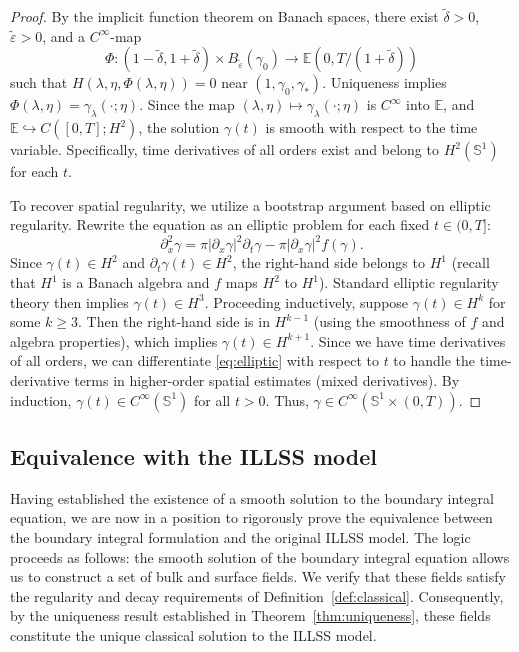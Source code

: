 \documentclass{article}
\theoremstyle{remark}
\theoremstyle{definition}
\numberwithin{equation}{section}
\begin{document}
\begin{proof}
    By the implicit function theorem on Banach spaces, there exist $\tilde{\delta} > 0$, $\tilde{\varepsilon} >0$, and a $C^\infty$-map 
    \[
        \Phi : (1- \tilde{\delta}, 1+ \tilde{\delta}) \times B_{\tilde{\varepsilon}}(\gamma_0) \to \mathbb{E}(0,T/(1+\tilde{\delta}))
    \]
    such that $H(\lambda, \eta, \Phi(\lambda, \eta)) = 0$ near $(1, \gamma_0, \gamma_*)$.
    Uniqueness implies $\Phi(\lambda, \eta) = \gamma_\lambda(\cdot; \eta)$.
    Since the map $(\lambda, \eta) \mapsto \gamma_\lambda(\cdot; \eta)$ is $C^\infty$ into $\mathbb{E}$, and $\mathbb{E} \hookrightarrow C([0,T]; H^2)$, the solution $\gamma(t)$ is smooth with respect to the time variable.
    Specifically, time derivatives of all orders exist and belong to $H^2(\mathbb{S}^1)$ for each $t$.
    
    To recover spatial regularity, we utilize a bootstrap argument based on elliptic regularity.
    Rewrite the equation as an elliptic problem for each fixed $t \in (0, T]$:
    \begin{equation} \label{eq:elliptic}
        \partial_x^2 \gamma = \pi |\partial_x \gamma|^2 \partial_t \gamma - \pi |\partial_x \gamma|^2 f(\gamma).
    \end{equation}
    Since $\gamma(t) \in H^2$ and $\partial_t \gamma(t) \in H^2$, the right-hand side belongs to $H^1$ (recall that $H^1$ is a Banach algebra and $f$ maps $H^2$ to $H^1$).
    Standard elliptic regularity theory then implies $\gamma(t) \in H^3$.
    Proceeding inductively, suppose $\gamma(t) \in H^k$ for some $k \ge 3$. Then the right-hand side is in $H^{k-1}$ (using the smoothness of $f$ and algebra properties), which implies $\gamma(t) \in H^{k+1}$.
    Since we have time derivatives of all orders, we can differentiate \eqref{eq:elliptic} with respect to $t$ to handle the time-derivative terms in higher-order spatial estimates (mixed derivatives).
    By induction, $\gamma(t) \in C^\infty(\mathbb{S}^1)$ for all $t > 0$.
    Thus, $\gamma \in C^\infty(\mathbb{S}^1 \times (0, T))$.
\end{proof}


\subsection{Equivalence with the ILLSS model}
\label{subsec:equivalence}

Having established the existence of a smooth solution to the boundary integral equation, we are now in a position to rigorously prove the equivalence between the boundary integral formulation and the original ILLSS model.
The logic proceeds as follows: the smooth solution of the boundary integral equation allows us to construct a set of bulk and surface fields.
We verify that these fields satisfy the regularity and decay requirements of Definition~\ref{def:classical}.
Consequently, by the uniqueness result established in Theorem~\ref{thm:uniqueness}, these fields constitute the unique classical solution to the ILLSS model.
\end{document}
